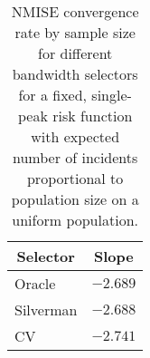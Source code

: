 \begin{table}[htbp]
\begin{center}
\begin{tabular}{lr}
\toprule
\multicolumn{1}{c}{Selector}&\multicolumn{1}{c}{Slope}\tabularnewline
\midrule
Oracle&$-2.689$\tabularnewline
Silverman&$-2.688$\tabularnewline
CV&$-2.741$\tabularnewline
\bottomrule
\end{tabular}
\caption[NMISE Convergence rate by sample size]{NMISE convergence rate by sample size for different bandwidth selectors for a fixed, single-peak risk function with expected number of incidents proportional to population size on a uniform population.\label{tab:results:nmise_convergence_by_sample_size}}\end{center}
\end{table}
